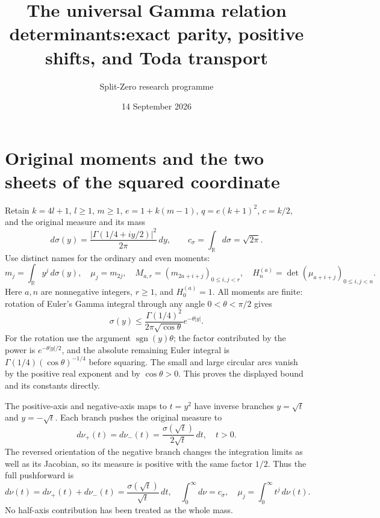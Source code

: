 \documentclass[11pt,a4paper]{article}
\title{The universal Gamma relation determinants:\newline exact parity, positive shifts, and Toda transport}
\author{Split-Zero research programme}
\date{14 September 2026}
\begin{document}
\maketitle

\section{Original moments and the two sheets of the squared coordinate}

Retain $k=4l+1$, $l\geq1$, $m\geq1$,
$e=1+k(m-1)$, $q=e(k+1)^2$, $c=k/2$, and the original
measure and its mass
\[
 d\sigma(y)=\frac{|\Gamma(1/4+iy/2)|^2}{2\pi}\,dy,
 \qquad c_\sigma=\int_{\mathbb R}d\sigma=\sqrt{2\pi}.
\tag{PHT1}
\]
Use distinct names for the ordinary and even moments:
\[
 m_j=\int_{\mathbb R}y^j\,d\sigma(y),\quad
 \mu_j=m_{2j},\quad
 M_{a,r}=(m_{2a+i+j})_{0\leq i,j<r},\quad
 H_n^{(a)}=\det(\mu_{a+i+j})_{0\leq i,j<n}.
\tag{PHT2}
\]
Here $a,n$ are nonnegative integers, $r\geq1$, and
$H_0^{(a)}=1$. All moments are finite: rotation of Euler's
Gamma integral through any angle $0<\theta<\pi/2$ gives
\[
 \sigma(y)\leq\frac{\Gamma(1/4)^2}{2\pi\sqrt{\cos\theta}}
                         e^{-\theta|y|}.
\]
For the rotation use the argument $\operatorname{sgn}(y)\theta$;
the factor contributed by the power is $e^{-\theta|y|/2}$,
and the absolute remaining Euler integral is
$\Gamma(1/4)(\cos\theta)^{-1/4}$ before squaring.
The small and large circular arcs vanish by the positive
real exponent and by $\cos\theta>0$. This proves the displayed
bound and its constants directly.

The positive-axis and negative-axis maps to $t=y^2$ have
inverse branches $y=\sqrt t$ and $y=-\sqrt t$. Each branch
pushes the original measure to
\[
 d\nu_+(t)=d\nu_-(t)=\frac{\sigma(\sqrt t)}{2\sqrt t}\,dt,
 \quad t>0.
\]
The reversed orientation of the negative branch changes the
integration limits as well as its Jacobian, so its measure is
positive with the same factor $1/2$. Thus the full pushforward is
\[
 d\nu(t)=d\nu_+(t)+d\nu_-(t)
        =\frac{\sigma(\sqrt t)}{\sqrt t}\,dt,
 \quad\int_0^\infty d\nu=c_\sigma,
 \quad\mu_j=\int_0^\infty t^j\,d\nu(t).
\tag{PHT3}
\]
No half-axis contribution has been treated as the whole mass.
\end{document}
